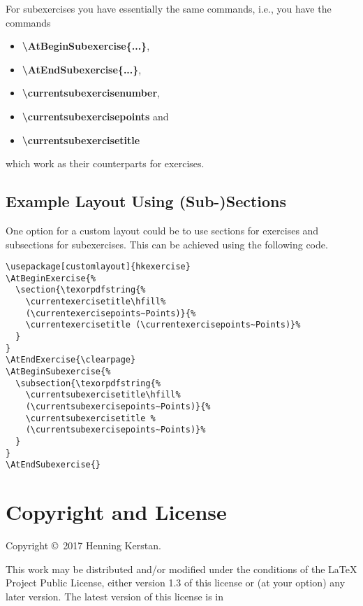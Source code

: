 \documentclass[
  twocolumn,%
  fontsize=9pt,%
  DIV=calc,%
  numbers=noendperiod%
]{scrartcl}
\begin{document}
\noindent For subexercises you have essentially the same commands, i.e., you have the commands 
\begin{itemize}
\item \textcolor{NavyBlue}{\ttfamily\bfseries\textbackslash AtBeginSubexercise\{...\}},
\item \textcolor{NavyBlue}{\ttfamily\bfseries\textbackslash AtEndSubexercise\{...\}}, 
\item \textcolor{NavyBlue}{\ttfamily\bfseries\textbackslash currentsubexercisenumber}, 
\item \textcolor{NavyBlue}{\ttfamily\bfseries\textbackslash currentsubexercisepoints} and 
\item \textcolor{NavyBlue}{\ttfamily\bfseries\textbackslash currentsubexercisetitle}
\end{itemize}
which work as their counterparts for exercises.

\subsection{Example Layout Using (Sub-)Sections}
One option for a custom layout could be to use sections for exercises and subsections for subexercises. This can be achieved using the following code.

\begin{lstlisting}
\usepackage[customlayout]{hkexercise}
\AtBeginExercise{%
  \section{\texorpdfstring{%
    \currentexercisetitle\hfill%
    (\currentexercisepoints~Points)}{%
    \currentexercisetitle (\currentexercisepoints~Points)}%
  }
}
\AtEndExercise{\clearpage}
\AtBeginSubexercise{%
  \subsection{\texorpdfstring{%
    \currentsubexercisetitle\hfill%
    (\currentsubexercisepoints~Points)}{%
    \currentsubexercisetitle %
    (\currentsubexercisepoints~Points)}%
  }
}
\AtEndSubexercise{}
\end{lstlisting}

\section{Copyright and License}
Copyright \copyright\ 2017 Henning Kerstan.\medskip

\noindent This work may be distributed and/or modified under the conditions of the LaTeX Project Public License, either version 1.3 of this license or (at your option) any later version. The latest version of this license is in\medskip
\end{document}
